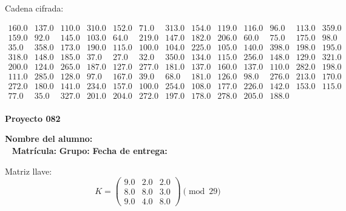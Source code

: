\documentclass[12pt]{article}
\begin{document}
Cadena cifrada:
\begin{center}
$\begin{array}{lllllllllllll}
160.0 & 137.0 & 110.0 & 310.0 & 152.0 & 71.0 & 313.0 & 154.0 & 119.0 & 116.0 & 96.0 & 113.0 & 359.0\\
159.0 & 92.0 & 145.0 & 103.0 & 64.0 & 219.0 & 147.0 & 182.0 & 206.0 & 60.0 & 75.0 & 175.0 & 98.0\\
35.0 & 358.0 & 173.0 & 190.0 & 115.0 & 100.0 & 104.0 & 225.0 & 105.0 & 140.0 & 398.0 & 198.0 & 195.0\\
318.0 & 148.0 & 185.0 & 37.0 & 27.0 & 32.0 & 350.0 & 134.0 & 115.0 & 256.0 & 148.0 & 129.0 & 321.0\\
200.0 & 124.0 & 265.0 & 187.0 & 127.0 & 277.0 & 181.0 & 137.0 & 160.0 & 137.0 & 110.0 & 282.0 & 198.0\\
111.0 & 285.0 & 128.0 & 97.0 & 167.0 & 39.0 & 68.0 & 181.0 & 126.0 & 98.0 & 276.0 & 213.0 & 170.0\\
272.0 & 180.0 & 141.0 & 234.0 & 157.0 & 100.0 & 254.0 & 108.0 & 177.0 & 226.0 & 142.0 & 153.0 & 115.0\\
77.0 & 35.0 & 327.0 & 201.0 & 204.0 & 272.0 & 197.0 & 178.0 & 278.0 & 205.0 & 188.0\\
\end{array}$
\end{center}

\newpage


\textbf{Proyecto 082}

\textbf{Nombre del alumno:} \underline{\hspace{13cm}}\\\
\vspace{1cm}
\textbf{Matrícula:} \underline{\hspace{4cm}} \hspace{1cm}
\textbf{Grupo:} \underline{\hspace{2cm}}
\textbf{Fecha de entrega:} \underline{\hspace{2cm}}

\medskip

Matriz llave:
\[
K = \begin{pmatrix}
9.0 & 2.0 & 2.0\\
8.0 & 8.0 & 3.0\\
9.0 & 4.0 & 8.0
\end{pmatrix} \pmod{29}
\]
\end{document}
